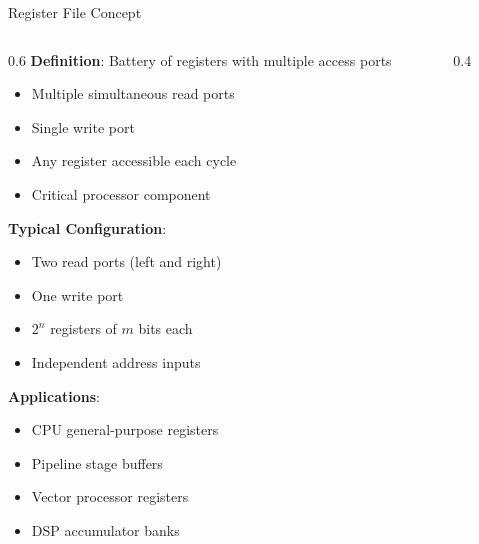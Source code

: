 \documentclass[aspectratio=169,11pt]{beamer}
\newcommand{\concept}[1]{\textbf{\color{accentcolor}#1}}
\begin{document}
\begin{frame}{Register File Concept}
\begin{columns}
\begin{column}{0.6\textwidth}
\concept{Definition}: Battery of registers with multiple access ports
\begin{itemize}
\item Multiple simultaneous read ports
\item Single write port
\item Any register accessible each cycle
\item Critical processor component
\end{itemize}
\vspace{0.3cm}
\concept{Typical Configuration}:
\begin{itemize}
\item Two read ports (left and right)
\item One write port
\item $2^n$ registers of $m$ bits each
\item Independent address inputs
\end{itemize}
\vspace{0.3cm}
\concept{Applications}:
\begin{itemize}
\item CPU general-purpose registers
\item Pipeline stage buffers
\item Vector processor registers
\item DSP accumulator banks
\end{itemize}
\end{column}
\begin{column}{0.4\textwidth}
\begin{center}

\end{center}
\end{column}
\end{columns}
\end{frame}
\end{document}

